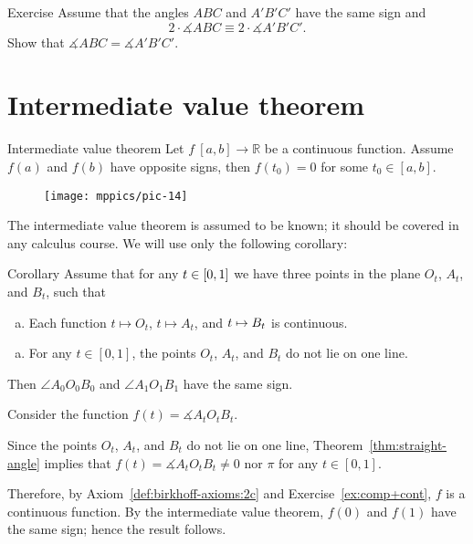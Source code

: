 \begin{thm}{Exercise}\label{ex:PP(PN)}
Assume that the angles $ABC$ and $A'B'C'$ have the same sign
and 
\[2\cdot \measuredangle ABC\equiv 2\cdot \measuredangle A'B'C'.\]
Show that $\measuredangle ABC= \measuredangle A'B'C'$.
\end{thm}

\section{Intermediate value theorem}

\begin{thm}{Intermediate value theorem}\label{thm:intermidiate}
Let $f\:[a,b]\to \mathbb{R}$ be a continuous function.
Assume 
$f(a)$ and $f(b)$ have opposite signs,
then $f(t_0)=0$ for some $t_0\in[a,b]$.
\end{thm}

\begin{wrapfigure}{r}{38mm}
\vskip-6mm
\centering
\texttt{[image: mppics/pic-14]}
\end{wrapfigure}

The intermediate value theorem is assumed to be known;
it should be covered in any calculus course.
We will use only the following corollary:

\begin{thm}[\abs]{Corollary}\label{cor:intermidiate}
Assume that for any $t\z\in [0,1]$ we have three points in the plane  $O_t$, $A_t$, and $B_t$, such that 
\begin{enumerate}[(a)]
\item Each function $t\mapsto O_t$, $t\mapsto A_t$, and $t\z\mapsto B_t$ is continuous.
\end{enumerate}

\begin{enumerate}[(a)]\addtocounter{enumi}{1}
\item For any $t\in [0,1]$, the points $O_t$, $A_t$, and $B_t$ do not lie on one line.  
\end{enumerate}
Then $\angle A_0O_0B_0$ and $\angle A_1O_1B_1$ have the same sign.
\end{thm}

Consider the function 
$f(t)=\measuredangle A_tO_tB_t$.

Since 
the points $O_t$, $A_t$, and $B_t$ do not lie on one line,
Theorem~\ref{thm:straight-angle} implies that $f(t)=\measuredangle A_tO_tB_t\ne 0$ nor $\pi$ for any $t\in[0,1]$.

Therefore, by Axiom~\ref{def:birkhoff-axioms:2c} and Exercise~\ref{ex:comp+cont},
$f$ is a continuous function.
By the intermediate value theorem, $f(0)$ and $f(1)$ have the same sign;
hence the result follows.
\qeds


